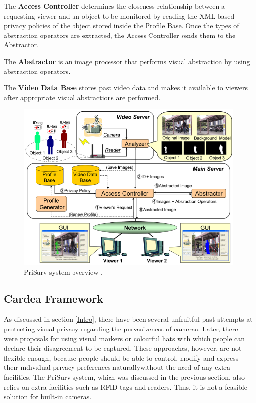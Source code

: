 \documentclass[conference]{IEEEtran}
\begin{document}
The \textbf{Access Controller} determines the closeness relationship between a requesting viewer and an object to be monitored by reading the \ac{XML}-based privacy policies of the object stored inside the Profile Base. Once the types of abstraction operators are extracted, the Access Controller sends them to the Abstractor. 

The \textbf{Abstractor} is an image processor that performs visual abstraction by using abstraction operators. 

The \textbf{Video Data Base} stores past video data and makes it available to viewers after appropriate visual abstractions are performed. 

\begin{figure}[t]
\centerline{\includegraphics[width=.5\textwidth]{img//prisurv_arch.png}}
\caption{PriSurv system overview \cite{chinomi2008PriSurv}.}
\label{fig:prisurv2}
\end{figure}

\subsection{Cardea Framework}\label{Cardea}
As discussed in section \ref{Intro}, there have been several unfruitful past attempts at protecting visual privacy regarding the pervasiveness of cameras. Later, there were proposals for using visual markers \cite{roesner2014, liu2014} or colourful hats \cite{sastry2007} with which people can declare their disagreement to be captured. These approaches, however, are not flexible enough, because people should be able to control, modify and express their individual privacy preferences naturally\textemdash without the need of any extra facilities. The PriSurv system, which was discussed in the previous section, also relies on extra facilities such as \ac{RFID}-tags and readers. Thus, it is not a feasible solution for built-in cameras. 
\end{document}
